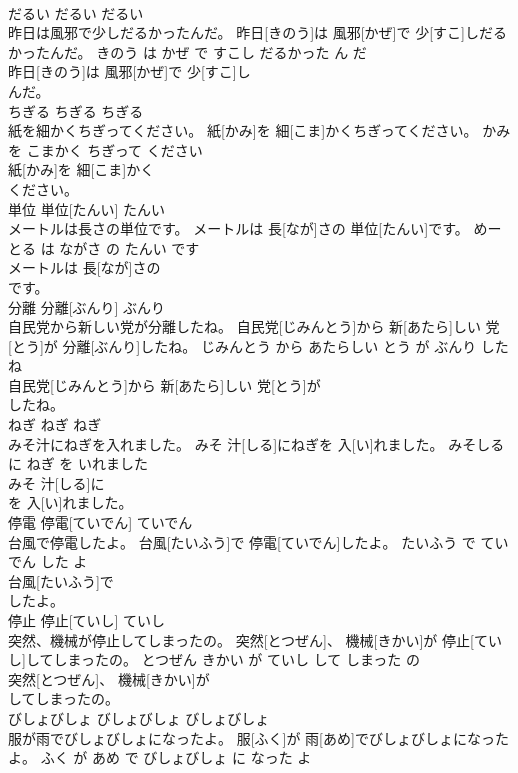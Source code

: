 \documentclass[8pt]{extreport}
\begin{document}
\begin{CJK}{UTF8}{min}
\\	だるい	だるい	だるい	
\\	昨日は風邪で少しだるかったんだ。	昨日[きのう]は 風邪[かぜ]で 少[すこ]しだるかったんだ。	きのう は かぜ で すこし だるかった ん だ	
\\	昨日[きのう]は 風邪[かぜ]で 少[すこ]し
\\	んだ。			
\\	ちぎる	ちぎる	ちぎる	
\\	紙を細かくちぎってください。	紙[かみ]を 細[こま]かくちぎってください。	かみ を こまかく ちぎって ください	
\\	紙[かみ]を 細[こま]かく
\\	ください。			
\\	単位	単位[たんい]	たんい	
\\	メートルは長さの単位です。	メートルは 長[なが]さの 単位[たんい]です。	めーとる は ながさ の たんい です	
\\	メートルは 長[なが]さの
\\	です。			
\\	分離	分離[ぶんり]	ぶんり	
\\	自民党から新しい党が分離したね。	自民党[じみんとう]から 新[あたら]しい 党[とう]が 分離[ぶんり]したね。	じみんとう から あたらしい とう が ぶんり した ね	
\\	自民党[じみんとう]から 新[あたら]しい 党[とう]が
\\	したね。			
\\	ねぎ	ねぎ	ねぎ	
\\	みそ汁にねぎを入れました。	みそ 汁[しる]にねぎを 入[い]れました。	みそしる に ねぎ を いれました	
\\	みそ 汁[しる]に
\\	を 入[い]れました。			
\\	停電	停電[ていでん]	ていでん	
\\	台風で停電したよ。	台風[たいふう]で 停電[ていでん]したよ。	たいふう で ていでん した よ	
\\	台風[たいふう]で
\\	したよ。			
\\	停止	停止[ていし]	ていし	
\\	突然、機械が停止してしまったの。	突然[とつぜん]、 機械[きかい]が 停止[ていし]してしまったの。	とつぜん きかい が ていし して しまった の	
\\	突然[とつぜん]、 機械[きかい]が
\\	してしまったの。			
\\	びしょびしょ	びしょびしょ	びしょびしょ	
\\	服が雨でびしょびしょになったよ。	服[ふく]が 雨[あめ]でびしょびしょになったよ。	ふく が あめ で びしょびしょ に なった よ	

\end{CJK}
\end{document}
